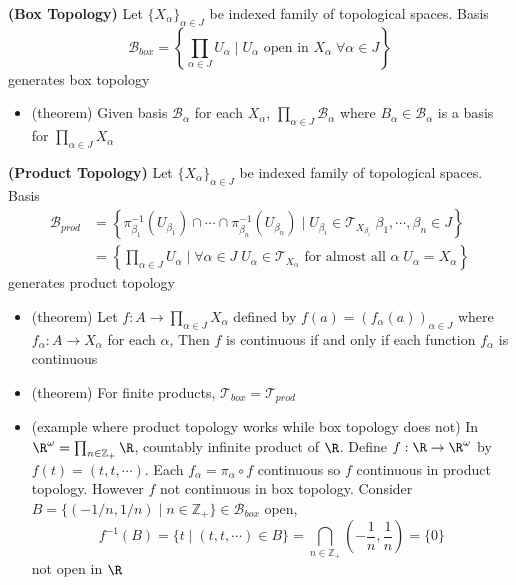 \documentclass[10.5pt]{article}
\newcommand{\Z}{\mathbb{Z}}
\newcommand{\calB}{\mathcal{B}}
\newcommand{\calT}{\mathcal{T}}
\begin{document}
\begin{defn*}
    \textbf{(Box Topology)} Let $\{X_{\alpha}\}_{\alpha\in J}$ be indexed family of topological spaces. Basis
    \[
        \calB_{box} = 
        \left\{
            \prod_{\alpha\in J} U_{\alpha} \mid U_{\alpha} \text{ open in } X_{\alpha} \; \forall \alpha \in J
        \right\}    
    \]
    generates box topology
    \begin{itemize}
        \item (theorem) Given basis $\calB_{\alpha}$ for each $X_{\alpha}$, $\textstyle \prod_{\alpha\in J} \calB_{\alpha}$ where $\textstyle B_{\alpha}\in \calB_{\alpha}$ is a basis for $\textstyle\prod_{\alpha\in J} X_{\alpha}$
    \end{itemize}
\end{defn*}

\begin{defn*}
    \textbf{(Product Topology)} Let $\{X_{\alpha}\}_{\alpha\in J}$ be indexed family of topological spaces. Basis
    \begin{align*}
        \calB_{prod}
        &= \left\{
            \pi_{\beta_1}^{-1}(U_{\beta_1}) \cap \cdots \cap \pi_{\beta_n}^{-1}(U_{\beta_n}) \mid U_{\beta_i} \in \calT_{X_{\beta_i}} \; \beta_1 ,\cdots, \beta_n \in J
        \right\} \\
        &= \left\{
            \prod_{\alpha\in J} U_{\alpha} \mid \forall \alpha \in J \; U_{\alpha} \in \calT_{X_{\alpha}} \text{  for almost all } \alpha \; U_{\alpha} = X_{\alpha}
        \right\}
    \end{align*}
    generates product topology
    \begin{itemize}
        \item (theorem) Let $\textstyle f:A\to \prod_{\alpha\in J} X_{\alpha}$ defined by $f(a) = (f_{\alpha}(a))_{\alpha\in J}$ where $f_{\alpha}: A\to X_{\alpha}$ for each $\alpha$, Then $f$ is continuous if and only if each function $f_{\alpha}$ is continuous
        \item (theorem) For finite products, $\calT_{box} = \calT_{prod}$
        \item (example where product topology works while box topology does not) In $\R^{\omega} = \textstyle \prod_{n\in \Z_+} \R$, countably infinite product of $\R$. Define $f:\R\to \R^{\omega}$ by $f(t) = (t,t,\cdots)$. Each $f_{\alpha} = \pi_{\alpha} \circ f$ continuous so $f$ continuous in product topology. However $f$ not continuous in box topology. Consider $B = \{ (-1/n, 1/n) \mid n\in \Z_+ \} \in \calB_{box}$ open,
        \[
            f^{-1}(B) 
            = \{ t \mid (t,t,\cdots) \in B \}
            = \bigcap_{n\in \Z_+} (-\frac{1}{n}, \frac{1}{n})
            = \{0\}
        \]
        not open in $\R$
    \end{itemize}
\end{defn*}
\end{document}
